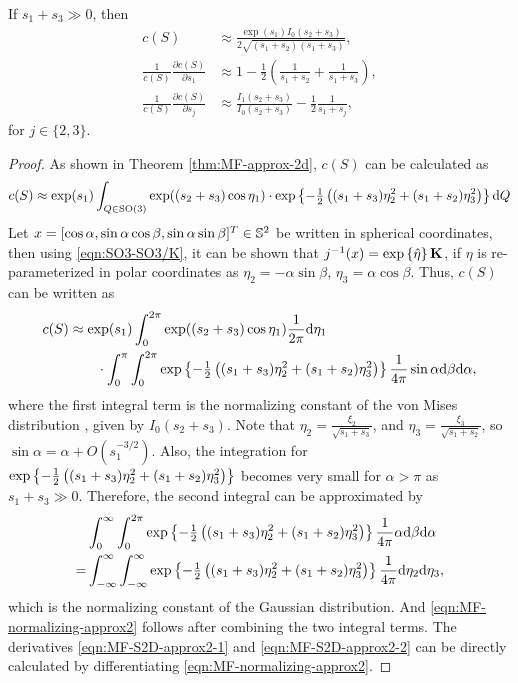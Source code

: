\begin{corollary}
	If $s_1+s_3 \gg 0$, then
	\begin{align}
		c(S) &\approx \frac{\exp(s_1)I_0(s_2+s_3)}{2\sqrt{(s_1+s_2)(s_1+s_3)}}, \label{eqn:MF-normalizing-approx2} \\
		\frac{1}{c(S)}\frac{\partial c(S)}{\partial s_1} &\approx 1 - \frac{1}{2}\left( \frac{1}{s_1+s_2} + \frac{1}{s_1+s_3} \right), \label{eqn:MF-S2D-approx2-1} \\
		\frac{1}{c(S)}\frac{\partial c(S)}{\partial s_j} &\approx \frac{I_1(s_2+s_3)}{I_0(s_2+s_3)} - \frac{1}{2}\frac{1}{s_1+s_j}, \label{eqn:MF-S2D-approx2-2}
	\end{align}
	for $j\in\{2,3\}$.
\end{corollary}
\begin{proof}
	As shown in Theorem \ref{thm:MF-approx-2d}, $c(S)$ can be calculated as
	\begin{align*}
		c(S) \approx \exp(s_1) \int_{Q\in\mathrm{SO}(3)} \exp((s_2+s_3)\cos\eta_1) \cdot \exp\left\{ -\tfrac{1}{2} \left( (s_1+s_3)\eta_2^2 + (s_1+s_2)\eta_3^2 \right) \right\} \mathrm{d} Q
	\end{align*}
	Let $x = [\cos\alpha, \sin\alpha\cos\beta, \sin\alpha\sin\beta]^T \in \mathbb{S}^2$ be written in spherical coordinates, then using \eqref{eqn:SO3-SO3/K}, it can be shown that $j^{-1}(x) = \exp\left\{ \hat{\eta} \right\} \mathbf{K}$, if $\eta$ is re-parameterized in polar coordinates as $\eta_2 = -\alpha\sin\beta$, $\eta_3 = \alpha\cos\beta$.
	Thus, $c(S)$ can be written as
	\begin{align*}
		c(S) &\approx \exp(s_1) \int_{0}^{2\pi} \exp((s_2+s_3)\cos\eta_1) \frac{1}{2\pi} \mathrm{d} \eta_1 \\
		&\qquad \cdot \int_{0}^\pi \int_{0}^{2\pi} \exp\left\{ -\tfrac{1}{2} \left( (s_1+s_3)\eta_2^2 + (s_1+s_2)\eta_3^2 \right) \right\} \frac{1}{4\pi} \sin\alpha \mathrm{d}\beta \mathrm{d}\alpha,
	\end{align*}
	where the first integral term is the normalizing constant of the von Mises distribution \cite[Chapter 3]{mardia2009directional}, given by $I_0(s_2+s_3)$.
	Note that $\eta_2 = \tfrac{\xi_2}{\sqrt{s_1+s_3}}$, and $\eta_3 = \tfrac{\xi_3}{\sqrt{s_1+s_2}}$, so $\sin\alpha = \alpha + O(s_1^{-3/2})$. Also, the integration for $\exp\left\{ -\tfrac{1}{2} \left( (s_1+s_3)\eta_2^2 + (s_1+s_2)\eta_3^2 \right) \right\}$ becomes very small for $\alpha > \pi$ as $s_1+s_3 \gg 0$.
	Therefore, the second integral can be approximated by
	\begin{align*}
		&\int_0^\infty \int_{0}^{2\pi} \exp\left\{ -\tfrac{1}{2} \left( (s_1+s_3)\eta_2^2 + (s_1+s_2)\eta_3^2 \right) \right\} \frac{1}{4\pi} \alpha \mathrm{d}\beta \mathrm{d}\alpha \\
		= &\int_{-\infty}^\infty \int_{-\infty}^\infty \exp\left\{ -\tfrac{1}{2} \left( (s_1+s_3)\eta_2^2 + (s_1+s_2)\eta_3^2 \right) \right\} \frac{1}{4\pi} \mathrm{d}\eta_2 \mathrm{d}\eta_3,
	\end{align*}
	which is the normalizing constant of the Gaussian distribution.
	And \eqref{eqn:MF-normalizing-approx2} follows after combining the two integral terms.
	The derivatives \eqref{eqn:MF-S2D-approx2-1} and \eqref{eqn:MF-S2D-approx2-2} can be directly calculated by differentiating \eqref{eqn:MF-normalizing-approx2}.
\end{proof}

